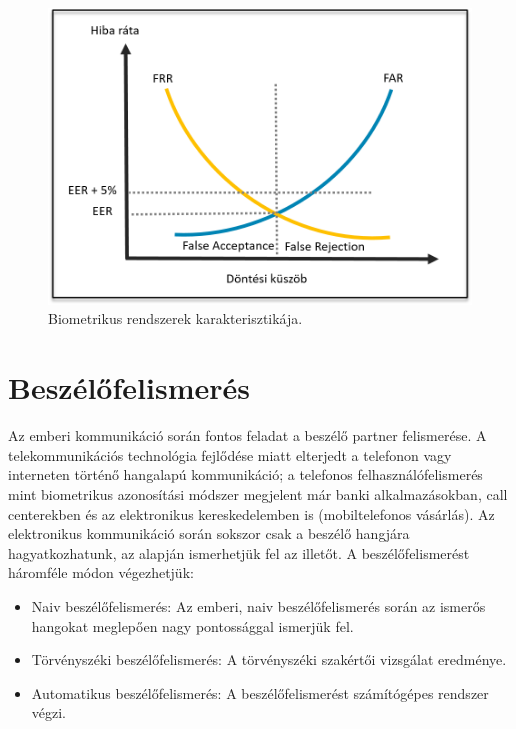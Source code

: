 \begin{figure}[!ht]
	\centering
	\includegraphics[width=150mm, keepaspectratio]{figures/eer.png}
	\caption{Biometrikus rendszerek karakterisztikája.}
	\label{fig:eer}
\end{figure}



\section{Beszélőfelismerés}

Az emberi kommunikáció során fontos feladat a beszélő partner felismerése. A telekommunikációs technológia fejlődése miatt elterjedt a telefonon vagy interneten történő hangalapú kommunikáció; a telefonos felhasználófelismerés mint biometrikus azonosítási módszer megjelent már banki alkalmazásokban, call centerekben és az elektronikus kereskedelemben is (mobiltelefonos vásárlás). Az elektronikus kommunikáció során sokszor csak a beszélő hangjára hagyatkozhatunk, az alapján ismerhetjük fel az illetőt. A beszélőfelismerést háromféle módon végezhetjük:

\begin{itemize}
	\item Naiv beszélőfelismerés: Az emberi, naiv beszélőfelismerés során az ismerős hangokat meglepően nagy pontossággal ismerjük fel.
	\item Törvényszéki beszélőfelismerés: A törvényszéki szakértői vizsgálat eredménye.
	\item Automatikus beszélőfelismerés: A beszélőfelismerést számítógépes rendszer végzi.
\end{itemize}

